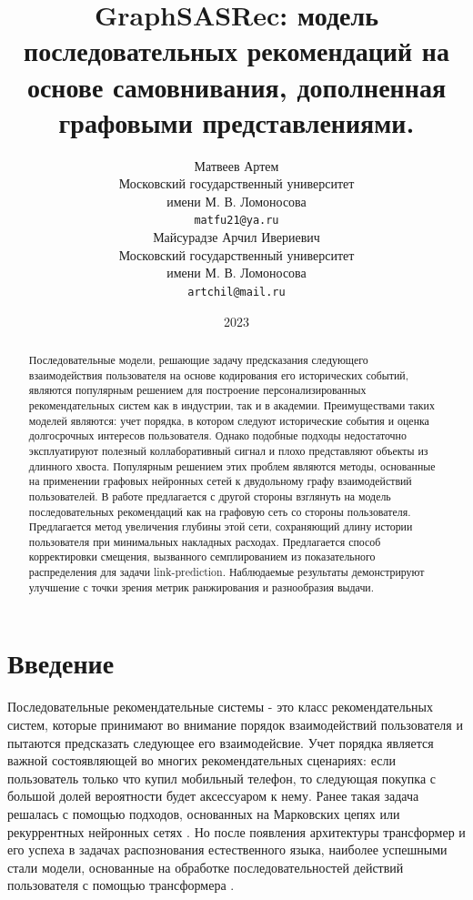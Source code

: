 \documentclass{article}
\title{GraphSASRec: модель последовательных рекомендаций на основе самовнивания, дополненная графовыми представлениями.}
\author{ 
	Матвеев Артем \\
    Московский государственный университет \\ 
	имени М. В. Ломоносова \\
	\texttt{matfu21@ya.ru} \\
	\And
	Майсурадзе Арчил Ивериевич \\
    Московский государственный университет \\
	имени М. В. Ломоносова \\
	\texttt{artchil@mail.ru} \\
}
\date{2023}
\begin{document}
\maketitle

\begin{abstract}
	Последовательные модели, решающие задачу предсказания следующего взаимодействия пользователя на 
	основе кодирования его исторических событий, являются популярным решением для построение 
	персонализированных рекомендательных систем как в индустрии, так и в академии. Преимуществами 
	таких моделей являются: учет порядка, в котором следуют исторические события и оценка долгосрочных 
	интересов пользователя. Однако подобные подходы недостаточно эксплуатируют полезный коллаборативный
	сигнал и плохо представляют объекты из длинного хвоста. Популярным решением этих проблем являются 
	методы, основанные на применении графовых нейронных сетей к двудольному графу взаимодействий 
	пользователей. В работе предлагается с другой стороны взглянуть на модель последовательных рекомендаций
	как на графовую сеть со стороны пользователя. Предлагается метод увеличения глубины этой сети,
	сохраняющий длину истории пользователя при минимальных накладных расходах. Предлагается способ корректировки
	смещения, вызванного семплированием из показательного распределения для задачи link-prediction. 
	Наблюдаемые результаты демонстрируют улучшение с точки зрения метрик ранжирования и разнообразия выдачи.
\end{abstract}



\section{Введение}

Последовательные рекомендательные системы - это класс рекомендательных систем, которые принимают 
во внимание порядок взаимодействий пользователя и пытаются предсказать следующее его взаимодейсвие.
Учет порядка является важной состоявляющей во многих рекомендательных сценариях: если пользователь
только что купил мобильный телефон, то следующая покупка с большой долей вероятности будет 
аксессуаром к нему. Ранее такая задача решалась с помощью подходов, основанных на Марковских 
цепях \cite{mc} или рекуррентных нейронных сетях \cite{rnn1,rnn2,rnn3}. Но после появления архитектуры
трансформер \cite{transformer} и его успеха в задачах распознования естественного языка, наиболее успешными
стали модели, основанные на обработке последовательностей действий пользователя с помощью трансформера 
\cite{sasrec,bert4rec,gsasrec}. 
\end{document}
